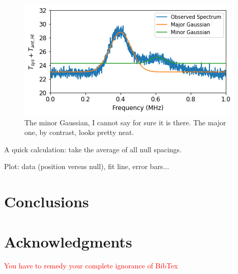 \documentclass[12pt]{article}
\begin{document}
\begin{figure}
\centering
	\includegraphics[width=.6\linewidth]{gauss}
	\caption{The minor Gaussian, I cannot say for sure it is there. The major one, by contrast, looks pretty neat.}
	\label{fig:gauss}
\end{figure}

A quick calculation: take the average of all null spacings.

Plot: data (position versus null), fit line, error bars...

\section{Conclusions}

\quad \quad 


\section{Acknowledgments}

\quad \quad \textcolor{red}{You have to remedy your complete ignorance of BibTex}
\end{document}
